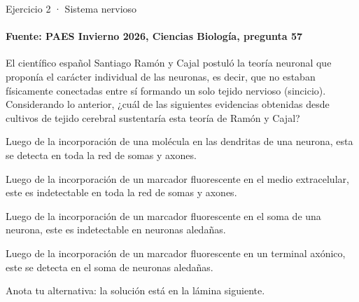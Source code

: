 \documentclass[aspectratio=169,11pt]{beamer}
\newcommand{\alternativa}[2]{\begin{opcion}\tecla{#1}\hspace{0.6em}#2\end{opcion}}
\newlength{\ajustealto}
\newenvironment{ajustar}[1][0.74\textheight]
  {\setlength{\ajustealto}{#1}\begin{lrbox}{\ajustecaja}\begin{minipage}{\textwidth}}
  {\end{minipage}\end{lrbox}%
   \ifdim\dimexpr\ht\ajustecaja+\dp\ajustecaja\relax>\ajustealto
     \resizebox*{!}{\ajustealto}{\usebox{\ajustecaja}}\else\usebox{\ajustecaja}\fi}
\begin{document}
\begin{frame}{Ejercicio 2 · Sistema nervioso}
\framesubtitle{Fuente: PAES Invierno 2026, Ciencias Biología, pregunta 57}
\begin{ajustar}[0.7\textheight]
{\small El científico español Santiago Ramón y Cajal postuló la teoría neuronal que proponía el carácter individual de las neuronas, es decir, que no estaban físicamente conectadas entre sí formando un solo tejido nervioso (sincicio). Considerando lo anterior, ¿cuál de las siguientes evidencias obtenidas desde cultivos de tejido cerebral sustentaría esta teoría de Ramón y Cajal?}
\vspace{0.4em}
\alternativa{A}{Luego de la incorporación de una molécula en las dendritas de una neurona, esta se detecta en toda la red de somas y axones.}
\alternativa{B}{Luego de la incorporación de un marcador fluorescente en el medio extracelular, este es indetectable en toda la red de somas y axones.}
\alternativa{C}{Luego de la incorporación de un marcador fluorescente en el soma de una neurona, este es indetectable en neuronas aledañas.}
\alternativa{D}{Luego de la incorporación de un marcador fluorescente en un terminal axónico, este se detecta en el soma de neuronas aledañas.}
\end{ajustar}
\vfill{\tiny\color{zinc500}\hfill Anota tu alternativa: la solución está en la lámina siguiente.}
\end{frame}
\end{document}

